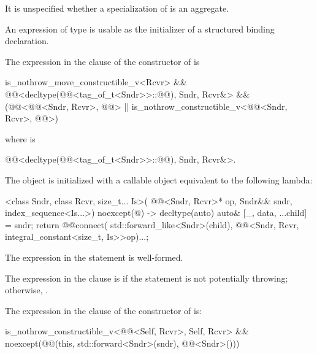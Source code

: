 \pnum
It is unspecified whether a specialization of 
is an aggregate.

\pnum
An expression of type  is usable as
the initializer of a structured binding declaration.

\pnum
The expression in the  clause of
the constructor of  is
\begin{codeblock}
is_nothrow_move_constructible_v<Rcvr> &&
@@<decltype(@@<tag_of_t<Sndr>>::@@), Sndr, Rcvr&> &&
(@@<@@<Sndr, Rcvr>, @@> ||
 is_nothrow_constructible_v<@@<Sndr, Rcvr>, @@>)
\end{codeblock}
where  is
\begin{codeblock}
@@<decltype(@@<tag_of_t<Sndr>>::@@), Sndr, Rcvr&>.
\end{codeblock}

\pnum
The object  is initialized with
a callable object equivalent to the following lambda:
\begin{itemdecl}
[]<class Sndr, class Rcvr, size_t... Is>(
  @@<Sndr, Rcvr>* op, Sndr&& sndr, index_sequence<Is...>) noexcept(@\seebelow@)
    -> decltype(auto) {
    auto& [_, data, ...child] = sndr;
    return @@{connect(
      std::forward_like<Sndr>(child),
      @@<Sndr, Rcvr, integral_constant<size_t, Is>>{op})...};
  }
\end{itemdecl}

\begin{itemdescr}
\pnum
\constraints
The expression in the  statement is well-formed.

\pnum
\remarks
The expression in the  clause is 
if the  statement is not potentially throwing;
otherwise, .
\end{itemdescr}

\pnum
The expression in the  clause of
the constructor of  is:
\begin{codeblock}
is_nothrow_constructible_v<@@<Self, Rcvr>, Self, Rcvr> &&
noexcept(@@(this, std::forward<Sndr>(sndr), @@<Sndr>()))
\end{codeblock}

